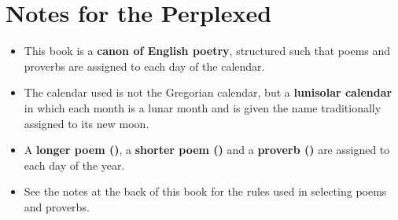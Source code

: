 \chapter*{Notes for the Perplexed}

\begin{itemize}[leftmargin=*]
    \item{This book is a \textbf{canon of English poetry}, structured such that poems and proverbs are assigned to each day of the calendar.}
    \item{The calendar used is not the Gregorian calendar, but a \textbf{lunisolar calendar} in which each month is a lunar month and is given the name traditionally assigned to its new moon.}
    \item{A \textbf{longer poem (\textsongsymbol)}, a \textbf{shorter poem (\textsonnetsymbol)} and a \textbf{proverb (\textproverbsymbol)} are assigned to each day of the year.}
    \item{See the notes at the back of this book for the rules used in selecting poems and proverbs.}
\end{itemize}
